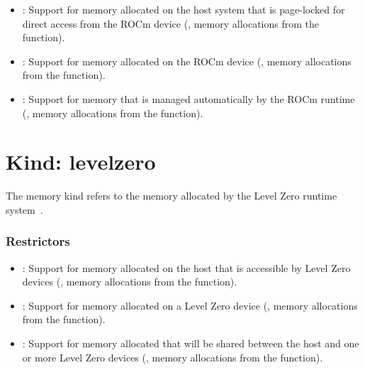 \begin{itemize}

\item {}: Support for memory allocated on the host system that
    is page-locked for direct access from the ROCm device (\eg, memory
        allocations from the  function).

\item {}: Support for memory allocated on the ROCm device
    (\eg, memory allocations from the  function).

\item {}: Support for memory that is managed automatically
    by the ROCm runtime (\eg, memory allocations from the
         function).

\end{itemize}

\section{Kind: levelzero}

The  memory kind refers to the memory allocated by the
Level Zero runtime system~\cite{zeref}.

\subsubsection{Restrictors}

\begin{itemize}

\item {}: Support for memory allocated on the host that is
    accessible by Level Zero devices (\eg, memory allocations from the
         function).

\item {}: Support for memory allocated on a Level Zero device
    (\eg, memory allocations from the  function). 

\item {}: Support for memory allocated that will be shared
    between the host and one or more Level Zero devices (\eg,
        memory allocations from the  function).

\end{itemize}
